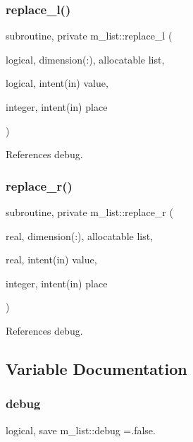 \subsubsection{\texorpdfstring{replace\+\_\+l()}{replace\_l()}}
{\footnotesize\ttfamily subroutine, private m\+\_\+list\+::replace\+\_\+l (\begin{DoxyParamCaption}\item[{logical, dimension(\+:), allocatable}]{list,  }\item[{logical, intent(in)}]{value,  }\item[{integer, intent(in)}]{place }\end{DoxyParamCaption})\hspace{0.3cm}{\ttfamily [private]}}



References debug.

\mbox{\label{namespacem__list_ac2ef50718d66bfe2fc102a3d48a28cb2}} 
\subsubsection{\texorpdfstring{replace\+\_\+r()}{replace\_r()}}
{\footnotesize\ttfamily subroutine, private m\+\_\+list\+::replace\+\_\+r (\begin{DoxyParamCaption}\item[{real, dimension(\+:), allocatable}]{list,  }\item[{real, intent(in)}]{value,  }\item[{integer, intent(in)}]{place }\end{DoxyParamCaption})\hspace{0.3cm}{\ttfamily [private]}}



References debug.



\subsection{Variable Documentation}
\mbox{\label{namespacem__list_aaa3ea916cd8c669ebbc8ec9096c5bbca}} 
\subsubsection{\texorpdfstring{debug}{debug}}
{\footnotesize\ttfamily logical, save m\+\_\+list\+::debug =.false.\hspace{0.3cm}{\ttfamily [private]}}

